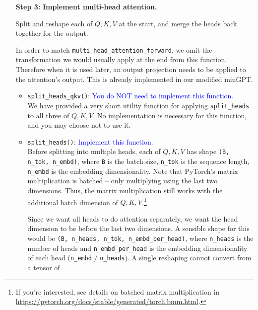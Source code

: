 \documentclass{article}
\begin{document}
\begin{enumerate}
        \item[\textbf{Step 3:}] 
        \textbf{Implement multi-head attention.}
        
        Split and reshape each of $Q,K,V$ at the start, and merge the heads back
        together for the output.
        
        In order to match \verb|multi_head_attention_forward|, we omit the
        transformation we would usually apply at the end from this function.
        Therefore when it is used later, an output projection needs to be
        applied to the attention's output. This is already implemented in our
        modified minGPT.


        \begin{itemize}
        \item \verb|split_heads_qkv()|: \textcolor{blue}{You do NOT need to
        implement this function.} \\
        We have provided a very short utility function for applying
        \verb|split_heads| to all three of $Q, K, V$. No implementation is
        necessary for this function, and you may choose not to use it.
        
        \item \verb|split_heads()|: \textcolor{blue}{Implement this function.}
        \\
        Before splitting into multiple heads, each of $Q,K,V$ has shape
        \verb|(B, n_tok, n_embd)|, where \verb|B| is the batch size,
        \verb|n_tok| is the sequence length, \verb|n_embd| is the embedding
        dimensionality. Note that PyTorch's matrix multiplication is batched --
        only multiplying using the last two dimensions. Thus, the matrix
        multiplication still works with the additional batch dimension of
        $Q,K,V$.\footnote{If you're interested, see details on batched matrix
        multiplication in
        \url{https://pytorch.org/docs/stable/generated/torch.bmm.html}.}
        
        Since we want all heads to do attention separately, we want the head
        dimension to be before the last two dimensions. A sensible shape for
        this would be \verb|(B, n_heads, n_tok, n_embd_per_head)|, where
        \verb|n_heads| is the number of heads and \verb|n_embd_per_head| is the
        embedding dimensionality of each head (\verb|n_embd| $/$
        \verb|n_heads|). A single reshaping cannot convert from a tensor of
        

\end{itemize}
\end{enumerate}
\end{document}
